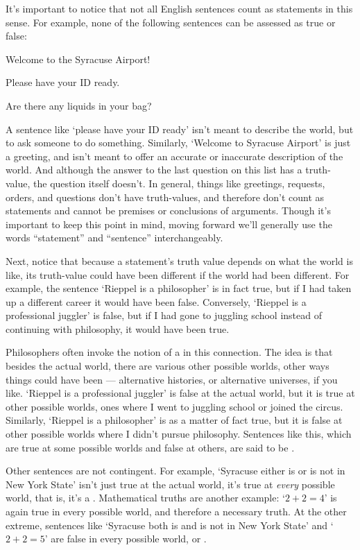 It's important to notice that not all English sentences count as statements in this sense.  For example, none of the following sentences can be assessed as true or false:

\begin{ebullet}
\item Welcome to the Syracuse Airport! 
\item Please have your ID ready.
\item Are there any liquids in your bag?
\end{ebullet}

A sentence like `please have your ID ready' isn't meant to describe the world, but to ask someone to do something.  Similarly, `Welcome to Syracuse Airport' is just a greeting, and isn't meant to offer an accurate or inaccurate description of the world.  And although the answer to the last question on this list has a truth-value, the question itself doesn't.  In general, things like greetings, requests, orders, and questions don't have truth-values, and therefore don't count as statements and cannot be premises or conclusions of arguments.  Though it's important to keep this point in mind, moving forward we'll generally use the words ``statement'' and ``sentence'' interchangeably.


Next, notice that because a statement's truth value depends on what the world is like, its truth-value could have been different if the world had been different.  For example, the sentence `Rieppel is a philosopher' is in fact true, but if I had taken up a different career it would have been false.  Conversely, `Rieppel is a professional juggler' is false, but if I had gone to juggling school instead of continuing with philosophy, it would have been true.   

Philosophers often invoke the notion of a  in this connection.  The idea is that besides the actual world, there are various other possible worlds, other ways things could have been --- alternative histories, or alternative universes, if you like.  `Rieppel is a professional juggler' is false at the actual world, but it is true at other possible worlds, ones where I went to juggling school or joined the circus.  Similarly, `Rieppel is a philosopher' is as a matter of fact true, but it is false at other possible worlds where I didn't pursue philosophy.  Sentences like this, which are true at some possible worlds and false at others, are said to be .

Other sentences are not contingent.  For example, `Syracuse either is or is not in New York State' isn't just true at the actual world, it's true at \emph{every} possible world, that is, it's a .  Mathematical truths are another example: `$2+2 = 4$' is again true in every possible world, and therefore a necessary truth. At the other extreme, sentences like `Syracuse both is and is not in New York State'  and `$2+2 = 5$' are false in every possible world, or .  

